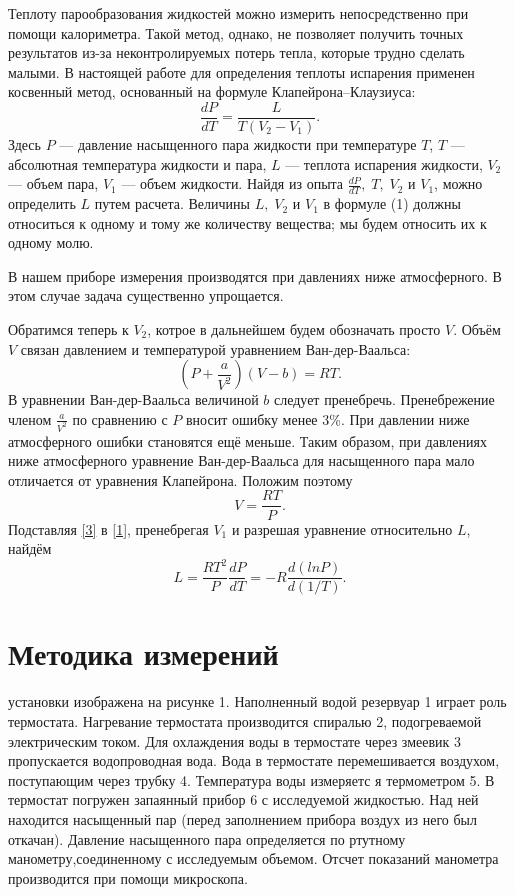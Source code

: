 \documentclass[a4paper, 12pt]{article}
\begin{document}
\par Теплоту парообразования жидкостей можно измерить непосредственно при помощи калориметра. Такой метод, однако, не позволяет получить точных результатов из-за неконтролируемых потерь тепла, которые трудно сделать малыми. В настоящей работе для определения теплоты испарения применен
косвенный метод, основанный на формуле Клапейрона–Клаузиуса:
\begin{equation}\label{1}
\frac{dP}{dT} = \frac{L}{T(V_2 - V_1)}.
\end{equation}
Здесь $P$ — давление насыщенного пара жидкости при температуре $T$, $T$ — абсолютная температура жидкости и пара, $L$ — теплота испарения жидкости, $V_2$ — объем пара, $V_1$ — объем жидкости. Найдя из опыта $\frac{dP}{dT},\; T,\; V_2$ и $V_1$, можно определить $L$ путем расчета. Величины $L, \;V_2$ и $V_1$ в формуле (1) должны относиться к одному и тому же количеству вещества; мы будем относить их к одному молю.
\par В нашем приборе измерения производятся при давлениях ниже атмосферного. В этом случае задача существенно упрощается.
\par Обратимся теперь к $V_2$, котрое в дальнейшем будем обозначать просто $V$. Объём $V$ связан давлением и температурой уравнением Ван-дер-Ваальса:
\begin{equation}\label{2}
\left(P+\frac{a}{V^2}\right)(V-b)=RT.
\end{equation}
В уравнении Ван-дер-Ваальса величиной $b$ следует пренебречь. Пренебрежение членом $\frac{a}{V^2}$ по сравнению с $P$ вносит ошибку менее 3\%. При давлении ниже атмосферного ошибки становятся ещё меньше. Таким образом, при давлениях ниже атмосферного уравнение Ван-дер-Ваальса для насыщенного пара мало отличается от уравнения Клапейрона. Положим поэтому
\begin{equation}\label{3}
V=\frac{RT}{P}.
\end{equation}
Подставляя \eqref{3} в \eqref{1}, пренебрегая $V_1$ и разрешая уравнение относительно $L$, найдём
\begin{equation}\label{4}
L=\frac{RT^2}{P} \frac{dP}{dT} = -R\frac{d(lnP)}{d(1/T)}.
\end{equation}

\section{Методика измерений}

 установки изображена на рисунке 1. Наполненный водой резервуар 1 играет роль термостата. Нагревание термостата производится спиралью 2, подогреваемой электрическим током. Для охлаждения воды в термостате через змеевик 3 пропускается водопроводная вода. Вода в термостате перемешивается воздухом,
поступающим через трубку 4. Температура воды измеряетс
я термометром 5. В термостат погружен запаянный прибор 6 с исследуемой жидкостью. Над ней находится насыщенный пар (перед заполнением прибора воздух из него был откачан).
Давление насыщенного пара определяется по ртутному манометру,соединенному с исследуемым объемом. Отсчет показаний манометра производится при помощи микроскопа.
\end{document}
